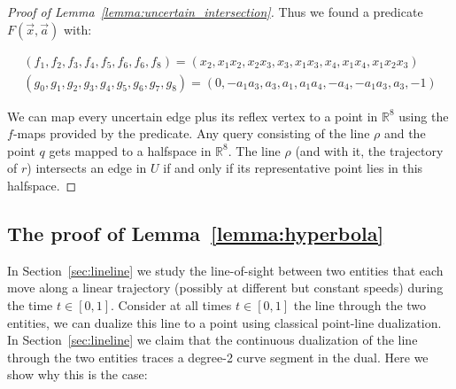 \documentclass[UKenglish]{lipics-v2019}
\begin{document}
\begin{proof}[Proof of Lemma~\ref{lemma:uncertain_intersection}]
Thus we found a predicate $F(\vec{x}, \vec{a})$ with:

\begin{align*}
    (f_1, f_2, f_3, f_4, f_5, f_6, f_6, f_8) = (x_2, x_1x_2, x_2x_3, x_3, x_1x_3, x_4, x_1x_4, x_1x_2x_3) \\
    (g_0, g_1, g_2, g_3, g_4, g_5,g_6, g_7,g_8) = (0, -a_1a_3, a_3, a_1, a_1a_4, -a_4, -a_1a_3, a_3, -1)
\end{align*}

We can map every uncertain edge plus its reflex vertex to a point in $\mathbb{R}^8$ using the $f$-maps provided by the predicate. Any query consisting of the line $\rho$ and the point $q$ gets mapped to a halfspace in $\mathbb{R}^8$. The line $\rho$ (and with it, the trajectory of $r$) intersects an edge in $U$ if and only if its representative point lies in this halfspace. 
\end{proof}


\subsection{The proof of Lemma~\ref{lemma:hyperbola} }

In Section~\ref{sec:lineline} we study the line-of-sight between two entities that each move along a linear trajectory (possibly at different but constant speeds) during the time $t \in [0,1]$. Consider at all times $t \in [0,1]$ the line through the two entities, we can dualize this line to a point using classical point-line dualization. In Section~\ref{sec:lineline} we claim that the continuous dualization of the line through the two entities traces a degree-2 curve segment in the dual. Here we show why this is the case:
\end{document}
